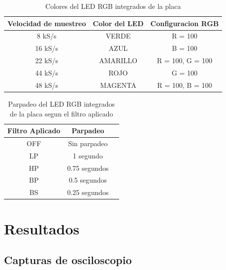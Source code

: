 \documentclass[11pt,a4paper]{article}
\begin{document}
\begin{table}[H]
    \centering
    \begin{tabular}{|c|c|c|}
        \hline
        \textbf{Velocidad de muestreo} & \textbf{Color del LED} & \textbf{Configuracion RGB} \\
        \hline
        8 kS/s                         & \color{green}VERDE     & R = 100                    \\
        16 kS/s                        & \color{blue}AZUL       & B = 100                    \\
        22 kS/s                        & \color{yellow}AMARILLO & R = 100, G = 100           \\
        44 kS/s                        & \color{red}ROJO        & G = 100                    \\
        48 kS/s                        & \color{magenta}MAGENTA & R = 100, B = 100           \\
        \hline
    \end{tabular}
    \caption{Colores del LED RGB integrados de la placa}
\end{table}

\begin{table}[H]
    \centering
    \begin{tabular}{|c|c|c|}
        \hline
        \textbf{Filtro Aplicado} & \textbf{Parpadeo} \\
        \hline
        OFF                       & Sin parpadeo      \\
        LP                        & 1 segundo         \\
        HP                        & 0.75 segundos     \\
        BP                        & 0.5 segundos      \\
        BS                        & 0.25 segundos     \\
        \hline
    \end{tabular}
    \caption{Parpadeo del LED RGB integrados de la placa segun el filtro aplicado}
\end{table}

\section{Resultados}

\subsection{Capturas de osciloscopio}
\end{document}
